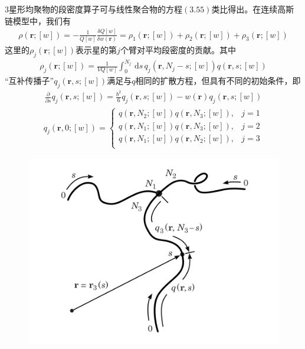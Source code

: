 $3$星形均聚物的段密度算子可与线性聚合物的方程$(3.55)$类比得出。在连续高斯链模型中，我们有
\begin{gather}
\rho(\mathbf{r};[w])=-\frac{1}{Q[w]}\frac{\delta Q[w]}{\delta w(\mathbf{r})}=\rho _1(\mathbf{r};[w])+\rho _2(\mathbf{r};[w])+\rho _3(\mathbf{r};[w])
\end{gather}
这里的$\rho _j(\mathbf{r};[w])$表示星的第$j$个臂对平均段密度的贡献。其中
\begin{gather}
\rho _{j}(\mathbf{r};[w])=\frac{1}{VQ[w]} \int_{0}^{N_j}\, \mathrm{d}s\,q_{j}(\mathbf{r},N_{j}-s;[w])q(\mathbf{r},s;[w])
\end{gather}
“互补传播子”$q_{j}(\mathbf{r},s;[w])$满足与$q$相同的扩散方程，但具有不同的初始条件，即
\begin{gather}
\frac{\partial}{\partial s}q_j(\mathbf{r},s;[w])=\frac{b^2}{6}q_j(\mathbf{r},s;[w])-w(\mathbf{r})q_j(\mathbf{r},s;[w])
\end{gather}
\begin{gather}
q_j(\mathbf{r},0;[w])=
\begin{cases}
q(\mathbf{r},N_2;[w])q(\mathbf{r},N_3;[w]), & j=1 \\
q(\mathbf{r},N_1;[w])q(\mathbf{r},N_3;[w]), & j=2 \\
q(\mathbf{r},N_1;[w])q(\mathbf{r},N_2;[w]), & j=3 \\
\end{cases}
\end{gather}

\begin{figure}[H]
\centering
\includegraphics[scale=0.7]{./figures/35.png}
\caption{}
\end{figure}

